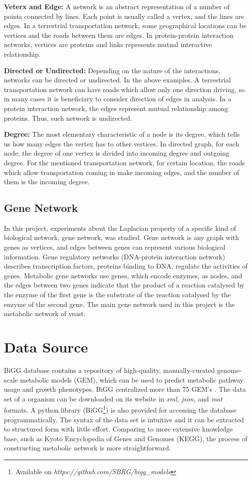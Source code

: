 \documentclass{article} %
\begin{document}
\textbf{Veterx and Edge:} 
A network is an abstract representation of a number of points connected by lines. Each point is usually called a vertex, and the lines are edges. In a terrestrial transportation network, some geographical locations can be vertices and the roads between them are edges. In protein-protein interaction networks, vertices are proteins and links represents mutual interactive relationship.

\textbf{Directed or Undirected:}
Depending on the nature of the interactions, networks can be directed or undirected. In the above examples. A terrestrial transportation network can have roads which allow only one direction driving, so in many cases it is beneficiary to consider direction of edges in analysis. In a protein interaction network, the edges represent mutual relationship among proteins. Thus, such network is undirected.

\textbf{Degree:}
The most elementary characteristic of a node is its degree, which tells us how many edges the vertex has to other vertices. In directed graph, for each node, the degree of one vertex is divided into incoming degree and outgoing degree. For the mentioned transportation network, for certain location, the roads which allow transportation coming in make incoming edges, and the number of them is the incoming degree.

\subsection{Gene Network}
In this project, experiments about the Laplacian property of a specific kind of biological network, gene network, was studied. Gene network is any graph with genes as vertices, and edges between genes can represent various biological information. Gene regulatory networks (DNA-protein interaction network) describes transcription factors, proteins binding to DNA, regulate the activities of genes. Metabolic gene networks use genes, which encode enzymes, as nodes, and the edges between two genes indicate that the product of a reaction catalysed by the enzyme of the first gene is the substrate of the reaction catalysed by the enzyme of the second gene. The main gene network used in this project is the metabolic network of yeast.

\section{Data Source} \label{section:background-end}
BiGG database contains a repository of high-quality, manually-curated genome-scale metabolic models (GEM), which can be used to predict metabolic pathway usage and growth phenotypes. BiGG centralized more than 75 GEM's \cite{king_bigg_2016}. The data set of a organism can be downloaded on its website in \textit{xml, json,} and \textit{mat} formats. A python library (BiGG\footnote{Available on \textit{https://github.com/SBRG/bigg\_models}}) is also provided for accessing the database programmatically. The syntax of the data set is intuitive and it can be extracted to structured form with little effort. Comparing to more extensive knowledge base, such as Kyoto Encyclopedia of Genes and Genomes (KEGG), the process of constructing metabolic network is more straightforward. 
\end{document}
